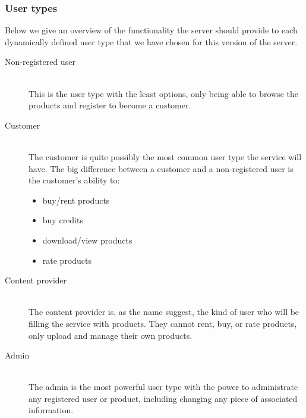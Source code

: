 \subsubsection{User types}
\label{s_actor-goal-list}
Below we give an overview of the functionality the server should provide to each dynamically defined user type that we have chosen for this version of the server. 

\begin{description}
	\item [Non-registered user] \hfill \\
		This is the user type with the least options, only being able to browse the products and register to become a customer.
	\item [Customer]  \hfill \\
		The customer is quite possibly the most common user type the service will have. The big difference between a customer and a non-registered user is the customer's ability to:
		\begin{itemize}
			\item buy/rent products
			\item buy credits
			\item download/view products
			\item rate products
		\end{itemize}
	\item [Content provider] \hfill \\
		The content provider is, as the name suggest, the kind of user who will be filling the service with products. They cannot rent, buy, or rate products, only upload and manage their own products.  
	\item [Admin] \hfill \\
		The admin is the most powerful user type with the power to administrate any registered user or product, including changing any piece of associated information.
\end{description}